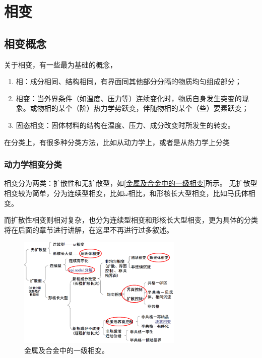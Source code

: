 \chapter{相变}
    \section{相变概念}
        关于相变，有一些最为基础的概念，
        \begin{enumerate}
            \item 相：成分相同、结构相同，有界面同其他部分分隔的物质均匀组成部分；
            \item 相变：当外界条件（如温度、压力等）连续变化时，物质自身发生突变的现象。或物相的某个（阶）热力学势跃变，伴随物相的某个（些）要素跃变；
            \item 固态相变：固体材料的结构在温度、压力、成分改变时所发生的转变。
        \end{enumerate}

        在分类上，有很多种分类方法，比如从动力学上，或者是从热力学上分类
            \subsection{动力学相变分类}
                相变分为两类：扩散性和无扩散型，如\autoref{金属及合金中的一级相变}所示。
                无扩散型相变较为简单，分为连续型相变，比如$\omega$相比，和形核长大型相变，比如马氏体相变。

                而扩散性相变则相对复杂，也分为连续型相变和形核长大型相变，更为具体的分类将在后面的章节进行讲解，在这里不再进行过多叙述。
                \begin{figure}[ht]
                    \centering
                    \includegraphics[width=0.7\textwidth]{fig/金属及合金中的一级相变.png}
                    \caption{金属及合金中的一级相变。}
                    \label{金属及合金中的一级相变}
                \end{figure}
